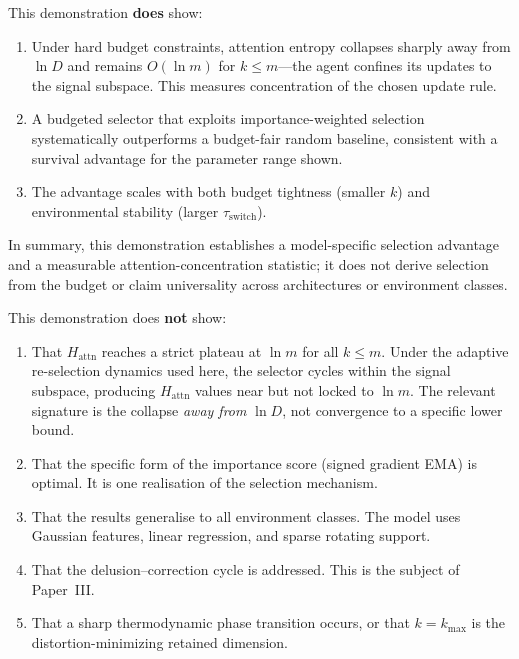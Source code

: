 \documentclass[12pt]{article}
\begin{document}
\medskip
This demonstration \textbf{does} show:
\begin{enumerate}
\item Under hard budget constraints, attention entropy
  collapses sharply away from $\ln D$ and remains
  $O(\ln m)$ for $k \leq m$---the agent confines its
  updates to the signal subspace.
  This measures concentration of the chosen update rule.
\item A budgeted selector that exploits importance-weighted
  selection systematically outperforms a budget-fair
  random baseline, consistent with a survival advantage
  for the parameter range shown.
\item The advantage scales with both budget tightness
  (smaller $k$) and environmental stability (larger
  $\tau_{\mathrm{switch}}$).
\end{enumerate}

\noindent
In summary, this demonstration establishes a model-specific selection
advantage and a measurable attention-concentration statistic; it does
not derive selection from the budget or claim universality across
architectures or environment classes.

\medskip
This demonstration does \textbf{not} show:
\begin{enumerate}
\item That $H_{\mathrm{attn}}$ reaches a strict plateau
  at $\ln m$ for all $k \leq m$.  Under the adaptive
  re-selection dynamics used here, the selector cycles
  within the signal subspace, producing
  $H_{\mathrm{attn}}$ values near but not locked to
  $\ln m$.  The relevant signature is the collapse
  \emph{away from} $\ln D$, not convergence to a
  specific lower bound.
\item That the specific form of the importance score
  (signed gradient EMA) is optimal.  It is one
  realisation of the selection mechanism.
\item That the results generalise to all environment
  classes.  The model uses Gaussian features, linear
  regression, and sparse rotating support.
\item That the delusion--correction cycle is addressed.
  This is the subject of Paper~III.
\item That a sharp thermodynamic phase transition occurs, or that
  $k=k_{\max}$ is the distortion-minimizing retained dimension.
\end{enumerate}
\end{document}
